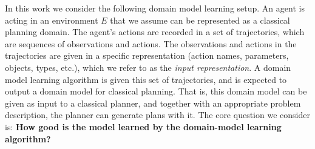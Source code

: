 \documentclass{article}
\theoremstyle{definition}
\theoremstyle{remark}
\newcommand{\realm}{{\ensuremath{M^*}}\xspace}
\newif\ifaddcomments
\newcommand{\roni}[1]{\ifaddcomments{\textcolor{red}{[Roni: #1]}}\fi}
\newcommand{\mauro}[1]{\ifaddcomments{\textcolor{green}{[Mauro: #1]}}\fi}
\newcommand{\gregor}[1]{\ifaddcomments{\textcolor{orange}{[Gregor: #1]}}\fi}
\begin{document}
In this work we consider the following domain model learning setup. 
An agent is acting in an environment $E$ that we assume can be represented as a classical planning domain. 
The agent's actions are recorded in a set of trajectories, which are sequences of observations and actions. 
The observations and actions in the trajectories are given in a specific representation (action names, parameters, objects, types, etc.), which we refer to as the \emph{input representation}. 
A domain model learning algorithm is given this set of trajectories, and is expected to output a domain model for classical planning. 
That is, this domain model can be given as input to a classical planner, and together with an appropriate problem description, the planner can generate plans with it.
The core question we consider is: \textbf{How good is the model learned by the domain-model learning algorithm?}
\end{document}
